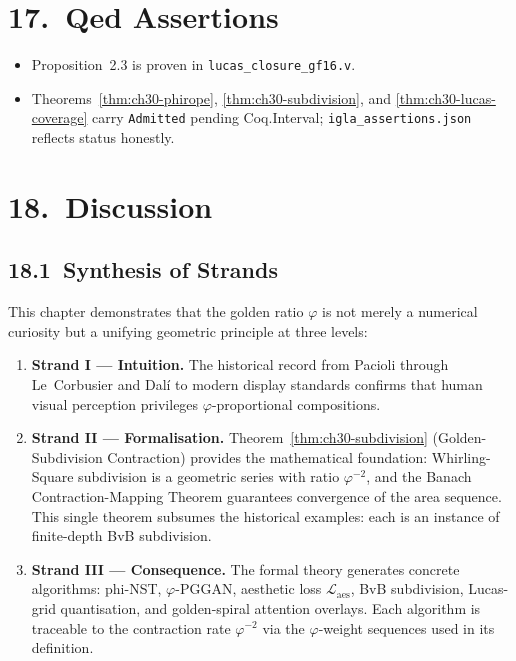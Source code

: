\section{17.\ Qed Assertions}\label{sec:ch30-qed}

\begin{itemize}
  \item Proposition~2.3 is proven in
    \texttt{lucas\_closure\_gf16.v}.
  \item Theorems~\ref{thm:ch30-phirope},
    \ref{thm:ch30-subdivision}, and
    \ref{thm:ch30-lucas-coverage} carry
    \texttt{Admitted} pending Coq.Interval;
    \texttt{igla\_assertions.json} reflects
    status honestly.
\end{itemize}

\section{18.\ Discussion}\label{sec:ch30-discussion}

\subsection{18.1\ Synthesis of
  Strands}\label{subsec:ch30-synthesis}

This chapter demonstrates that the golden ratio
$\varphi$ is not merely a numerical curiosity but
a unifying geometric principle at three levels:

\begin{enumerate}
  \item \textbf{Strand I --- Intuition.}
    The historical record from Pacioli
    \cite{pacioli_divina} through Le~Corbusier
    \cite{lecorbusier_modulor} and Dal\'{i}
    to modern display standards confirms that
    human visual perception privileges
    $\varphi$-proportional compositions.

  \item \textbf{Strand II --- Formalisation.}
    Theorem~\ref{thm:ch30-subdivision} (Golden-Subdivision
    Contraction) provides the mathematical
    foundation: Whirling-Square subdivision
    is a geometric series with ratio
    $\varphi^{-2}$, and the Banach
    Contraction-Mapping Theorem guarantees
    convergence of the area sequence.  This
    single theorem subsumes the historical
    examples: each is an instance of
    finite-depth BvB subdivision.

  \item \textbf{Strand III --- Consequence.}
    The formal theory generates concrete
    algorithms: phi-NST, $\varphi$-PGGAN,
    aesthetic loss $\mathcal{L}_{\text{aes}}$,
    BvB subdivision, Lucas-grid quantisation,
    and golden-spiral attention overlays.
    Each algorithm is traceable to the
    contraction rate $\varphi^{-2}$ via the
    $\varphi$-weight sequences used in its
    definition.
\end{enumerate}

